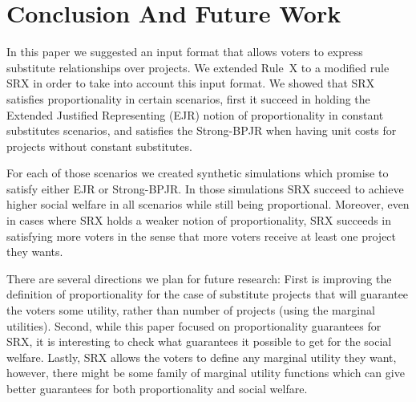\documentclass[runningheads]{llncs}
\begin{document}

\section{Conclusion And Future Work}

In this paper we suggested an input format that allows  voters to express substitute relationships over projects. We extended Rule~X to a modified rule SRX in order to take into account this input format.
We showed that SRX satisfies proportionality in certain scenarios, first it succeed in holding the Extended Justified Representing (EJR) notion of proportionality \cite{peters2020proportional} in constant substitutes scenarios,   and satisfies the  Strong-BPJR \cite{aziz2017proportionally} when having  unit costs for projects without constant substitutes. 

For each of those scenarios we created synthetic simulations which promise to satisfy either EJR or Strong-BPJR. In those simulations SRX succeed to achieve higher social welfare in all scenarios while still being proportional. Moreover, even in cases where SRX holds a weaker notion of proportionality, SRX succeeds in satisfying more voters in the sense that more voters receive at least one project they wants. 

There are several directions we plan for future research:
First is improving the definition of proportionality for the case of substitute projects that will guarantee the voters some utility, rather than number of projects (using the marginal utilities).
Second, while this paper focused on proportionality guarantees for SRX, it is interesting to check what guarantees it possible to get for the social welfare.
Lastly, SRX allows the voters to define any marginal utility they want, however, there might be some family of marginal utility functions which can give better guarantees for both proportionality and social welfare.

%
%
%


%

\end{document}
